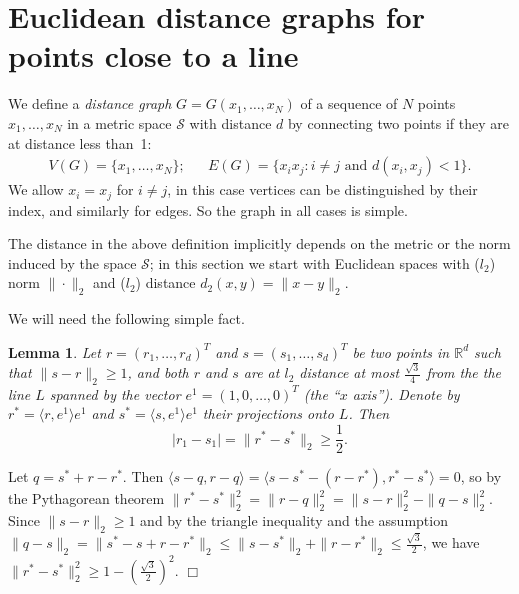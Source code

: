 \documentclass{article}
\newenvironment{proof}{\noindent{\bf Proof}}{\hspace*{\fill}$\Box$}
\newtheorem{lemma} [theorem] {Lemma}\newtheorem{attempt} [theorem] {Attempt}\newtheorem{corollary} [theorem] {Corollary}\newtheorem{prop} [theorem] {Proposition}\newtheorem{definition} [theorem] {Definition}\newtheorem{remark} [theorem] {Remark}\newtheorem{conjecture} [theorem] {Conjecture}\newtheorem{claim} [theorem] {Claim}
\begin{document}
\section {Euclidean distance graphs for points close to a line}
\label{sec.perfect}

We define a \emph{distance graph} $G=G(x_1, \dots, x_N)$
of a sequence of $N$ points $x_1, \dots, x_N$ in a metric space $\mathcal{S}$ with distance $d$ by connecting two points if they are at distance less than~1:
\begin{align*}
    V(G) = \{x_1, \dots, x_N\}; & &  E(G) = \{x_i x_j : i \ne j \mbox { and } d(x_i,x_j) < 1\}.
\end{align*}
We allow $x_i = x_j$ for $i \ne j$, in this case vertices can be distinguished by their index,
and similarly for edges. So the graph in all cases is simple.

The distance in the above definition implicitly depends on the metric or the norm induced by the space $\mathcal S$; in this section we start with Euclidean spaces with ($l_2$) norm $\|\cdot\|_2$ and ($l_2$) distance $d_2(x,y) = \|x-y\|_2$. 

We will need the following simple fact.
\begin{lemma}\label{lem.pyth}
    Let $r=(r_1, \dots, r_d)^T$ and $s=(s_1, \dots, s_d)^T$ be
    two points in $\mathbb{R}^d$ such that $\|s-r\|_2 \ge 1$,
    and both $r$ and $s$ are at $l_2$ distance at most $\frac {\sqrt 3} 4$ from the 
    the line $L$ spanned by the vector $e^1 = (1,0, \dots, 0)^T$ (the ``$x$ axis'').
Denote by $r^*=\langle r, e^1 \rangle e^1$ and $s^*=\langle s,e^1 \rangle e^1$ their projections
    onto $L$. Then
    \begin{equation*} |r_1 - s_1| = \|r^*-s^*\|_2 \ge \frac 1 2.
    \end{equation*}
\end{lemma}

\begin{proof}
    Let $q=s^*+r-r^*$. Then $\langle s-q, r-q \rangle=\langle s-s^* - (r-r^*), r^*-s^* \rangle = 0$, so 
    by the Pythagorean theorem $\|r^*-s^*\|^2_2=\|r-q\|^2_2=\|s-r\|^2_2-\|q-s\|^2_2$. 
    Since $\|s-r\|_2 \ge 1$ 
    and by the triangle inequality and the assumption $\|q-s\|_2 = \|s^*-s +r-r^*\|_2 \le \|s-s^*\|_2 + \|r-r^*\|_2 \le \frac {\sqrt 3} 2$,
    we have $\|r^*-s^*\|^2_2 \ge 1 - (\frac{\sqrt 3} 2)^2$. \end{proof}
\end{document}
